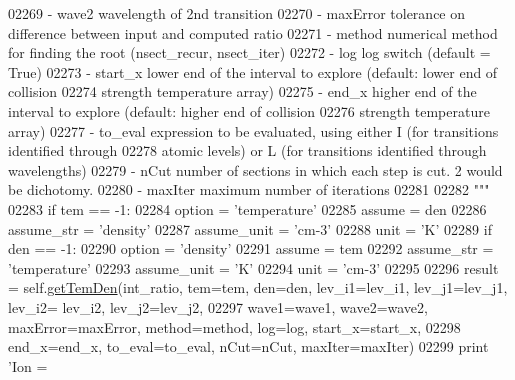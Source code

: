 \begin{DoxyCode}
{{{{{{{{{{{{{{02269 \textcolor{stringliteral}{            - wave2        wavelength of 2nd transition}
02270 \textcolor{stringliteral}{            - maxError     tolerance on difference between input and computed ratio }
02271 \textcolor{stringliteral}{            - method       numerical method for finding the root (nsect\_recur, nsect\_iter)}
02272 \textcolor{stringliteral}{            - log          log switch (default = True)}
02273 \textcolor{stringliteral}{            - start\_x      lower end of the interval to explore (default: lower end of collision }
02274 \textcolor{stringliteral}{                            strength temperature array)}
02275 \textcolor{stringliteral}{            - end\_x        higher end of the interval to explore (default: higher end of collision }
02276 \textcolor{stringliteral}{                            strength temperature array)}
02277 \textcolor{stringliteral}{            - to\_eval      expression to be evaluated, using either I (for transitions identified through }
02278 \textcolor{stringliteral}{                            atomic levels) or L (for transitions identified through wavelengths)}
02279 \textcolor{stringliteral}{            - nCut        number of sections in which each step is cut. 2 would be dichotomy.}
02280 \textcolor{stringliteral}{            - maxIter     maximum number of iterations}
02281 \textcolor{stringliteral}{}
02282 \textcolor{stringliteral}{        """}
02283         \textcolor{keywordflow}{if} tem == -1:
02284             option = \textcolor{stringliteral}{'temperature'}
02285             assume = den
02286             assume\_str = \textcolor{stringliteral}{'density'}
02287             assume\_unit = \textcolor{stringliteral}{'cm-3'}
02288             unit = \textcolor{stringliteral}{'K'}
02289         \textcolor{keywordflow}{if} den == -1:
02290             option = \textcolor{stringliteral}{'density'}
02291             assume = tem
02292             assume\_str = \textcolor{stringliteral}{'temperature'}
02293             assume\_unit = \textcolor{stringliteral}{'K'}
02294             unit = \textcolor{stringliteral}{'cm-3'}
02295 
02296         result = self.\hyperlink{classpyneb_1_1core_1_1pynebcore_1_1_atom_a5e1aa59c92bf62bae8bd756a4405eb25}{getTemDen}(int\_ratio, tem=tem, den=den, lev\_i1=lev\_i1, lev\_j1=lev\_j1, lev\_i2=
      lev\_i2, lev\_j2=lev\_j2,
02297                                 wave1=wave1, wave2=wave2, maxError=maxError, method=method, log=log, 
      start\_x=start\_x,
02298                                 end\_x=end\_x, to\_eval=to\_eval, nCut=nCut, maxIter=maxIter)
02299         \textcolor{keywordflow}{print} \textcolor{stringliteral}{'Ion = %
}}}}}}}}}}}}}}}
\end{DoxyCode}
